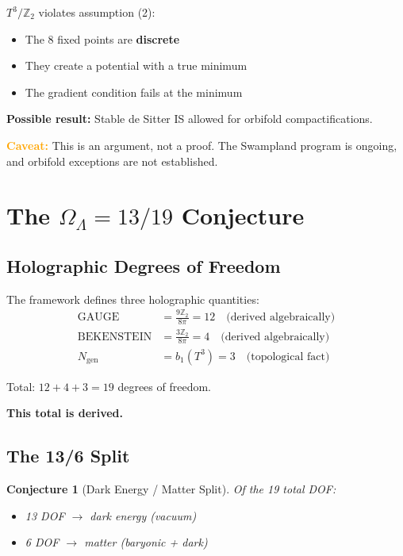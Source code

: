 \documentclass[12pt,a4paper]{article}
\newtheorem{conjecture}{Conjecture}
\begin{document}
$T^3/\mathbb{Z}_2$ violates assumption (2):
\begin{itemize}
    \item The 8 fixed points are \textbf{discrete}
    \item They create a potential with a true minimum
    \item The gradient condition fails at the minimum
\end{itemize}

\textbf{Possible result:} Stable de Sitter IS allowed for orbifold compactifications.

\textcolor{orange}{\textbf{Caveat:}} This is an argument, not a proof. The Swampland program is ongoing, and orbifold exceptions are not established.

\section{The $\Omega_\Lambda = 13/19$ Conjecture}

\subsection{Holographic Degrees of Freedom}

The framework defines three holographic quantities:
\begin{align}
\text{GAUGE} &= \frac{9\mathbb{Z}_2}{8\pi} = 12 \quad \text{(derived algebraically)} \\
\text{BEKENSTEIN} &= \frac{3\mathbb{Z}_2}{8\pi} = 4 \quad \text{(derived algebraically)} \\
N_{\text{gen}} &= b_1(T^3) = 3 \quad \text{(topological fact)}
\end{align}

Total: $12 + 4 + 3 = 19$ degrees of freedom.

\textbf{This total is derived.}

\subsection{The 13/6 Split}

\begin{conjecture}[Dark Energy / Matter Split]
Of the 19 total DOF:
\begin{itemize}
    \item 13 DOF $\to$ dark energy (vacuum)
    \item 6 DOF $\to$ matter (baryonic + dark)
\end{itemize}
\end{conjecture}
\end{document}
